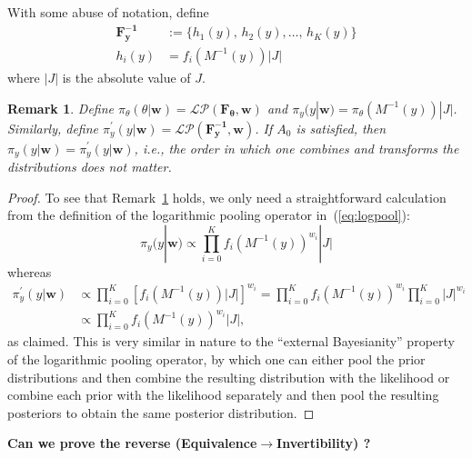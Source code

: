 \documentclass[11pt]{article}
\newtheorem{rmk}{Remark}[]
\begin{document}
With some abuse of notation, define
  \begin{align}
  \label{eq:transfF}
  \mathbf{F^{-1}_y} &:= \{h_1(y), \, h_2(y), \ldots, \, h_K(y) \} \\
  h_i(y) & = f_i(M^{-1}(y))|J|\nonumber
  \end{align}
where $|J|$ is the absolute value of $J$.
\begin{rmk}
\label{rmk:invariance}
Define $\pi_{\theta}(\theta | \mathbf{w}) =  \mathcal{LP}(\mathbf{F_\theta}, \mathbf{w})$ and $\pi_{y}(y |\mathbf{w}) = \pi_{\theta}(M^{-1}(y))|J|$.
Similarly, define $\pi^{\prime}_{y}(y|\mathbf{w}) = \mathcal{LP}(\mathbf{F^{-1}_y}, \mathbf{w})$.
If $A_0$ is satisfied, then $\pi_{y}(y |\mathbf{w}) = \pi^{\prime}_{y}(y|\mathbf{w})$, i.e., the order in which one combines and transforms the distributions does not matter.
\end{rmk}
\begin{proof}
To see that Remark~\ref{rmk:invariance} holds, we only need a straightforward calculation from the definition of the logarithmic pooling operator in~(\ref{eq:logpool}):
\[\pi_{y}(y |\mathbf{w}) \propto \prod_{i=0}^K f_i(M^{-1}(y))^{w_i}|J| \]
whereas
\begin{align*}
 \pi^{\prime}_{y}(y|\mathbf{w}) &\propto  \prod_{i=0}^K \left[ f_i(M^{-1}(y))|J| \right] ^{w_i} = \prod_{i=0}^K f_i(M^{-1}(y))^{w_i} \prod_{i=0}^K|J|^{w_i}\\
 &\propto  \prod_{i=0}^K f_i(M^{-1}(y))^{w_i}|J|, %
\end{align*}
as claimed.
This is very similar in nature to the ``external Bayesianity'' property of the logarithmic pooling operator, by which one can either pool the prior distributions and then combine the resulting distribution with the likelihood or combine each prior with the likelihood separately and then pool the resulting posteriors to obtain the same posterior distribution.
\end{proof}

\textbf{\large Can we prove the reverse (Equivalence$\to$Invertibility) ?}
\end{document}
